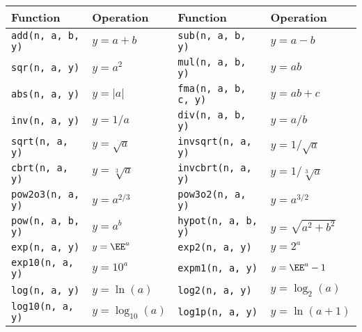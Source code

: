 \documentclass[11pt,bib,mint,hyper,altcolor]{marticle}
\begin{document}
\begin{table}[t]
  \begin{tabu}{X[l]X[l]X[l]X[l]}
    \toprule
    Function & Operation & Function & Operation \\
    \midrule
    \texttt{add(n, a, b, y)}    & $y = a + b$                               &
    \texttt{sub(n, a, b, y)}    & $y = a - b$                               \\
    \texttt{sqr(n, a, y)}       & $y = a^2$                                 &
    \texttt{mul(n, a, b, y)}    & $y = ab$                                  \\
    \texttt{abs(n, a, y)}       & $y = |a|$                                 &
    \texttt{fma(n, a, b, c, y)} & $y = ab + c$                              \\
    \texttt{inv(n, a, y)}       & $y = 1 / a$                               &
    \texttt{div(n, a, b, y)}    & $y = a / b$                               \\
    \texttt{sqrt(n, a, y)}      & $y = \sqrt{a}$                            &
    \texttt{invsqrt(n, a, y)}   & $y = 1 / \sqrt{a}$                        \\
    \texttt{cbrt(n, a, y)}      & $y = \sqrt[3]{a}$                         &
    \texttt{invcbrt(n, a, y)}   & $y = 1 / \sqrt[3]{a}$                     \\
    \texttt{pow2o3(n, a, y)}    & $y = a^{2/3}$                             &
    \texttt{pow3o2(n, a, y)}    & $y = a^{3/2}$                             \\
    \texttt{pow(n, a, b, y)}    & $y = a^b$                                 &
    \texttt{hypot(n, a, b, y)}  & $y = \sqrt{a^2 + b^2}$                    \\
    \texttt{exp(n, a, y)}       & $y = \EE^a$                               &
    \texttt{exp2(n, a, y)}      & $y = 2^a$                                 \\
    \texttt{exp10(n, a, y)}     & $y = 10^a$                                &
    \texttt{expm1(n, a, y)}     & $y = \EE^a - 1$                           \\
    \texttt{log(n, a, y)}       & $y = \ln(a)$                              &
    \texttt{log2(n, a, y)}      & $y = \log_2(a)$                           \\
    \texttt{log10(n, a, y)}     & $y = \log_{10}(a)$                        &
    \texttt{log1p(n, a, y)}     & $y = \ln(a + 1)$                          \\

\end{tabu}
\end{table}
\end{document}
